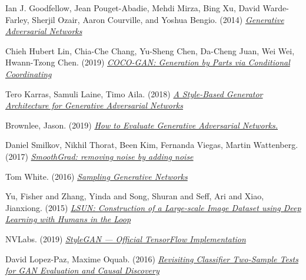 \documentclass[12pt]{article}
\begin{document}
    \begin{thebibliography}{9}
        Ian J. Goodfellow, Jean Pouget-Abadie, Mehdi Mirza, Bing Xu, David Warde-Farley, Sherjil Ozair, Aaron Courville, and Yoshua Bengio. (2014)
        \href{https://papers.nips.cc/paper/2014/file/5ca3e9b122f61f8f06494c97b1afccf3-Paper.pdf}{\textit{Generative Adversarial Networks} }

        Chieh Hubert Lin, Chia-Che Chang, Yu-Sheng Chen, Da-Cheng Juan, Wei Wei, Hwann-Tzong Chen. (2019)
        \href{https://arxiv.org/pdf/1904.00284.pdf}{\textit{COCO-GAN: Generation by Parts via Conditional Coordinating} }

        Tero Karras, Samuli Laine, Timo Aila. (2018)
        \href{https://arxiv.org/pdf/1812.04948.pdf}{\textit{A Style-Based Generator Architecture for Generative Adversarial Networks} }

        Brownlee, Jason. (2019)
        \href{https://machinelearningmastery.com/how-to-evaluate-generative-adversarial-networks/}{\textit{How to Evaluate Generative Adversarial Networks.} }

        Daniel Smilkov, Nikhil Thorat, Been Kim, Fernanda Viegas, Martin Wattenberg. (2017)
        \href{https://arxiv.org/pdf/1706.03825.pdf}{\textit{SmoothGrad: removing noise by adding noise} }

        Tom White. (2016)
        \href{https://arxiv.org/pdf/1609.04468.pdf}{\textit{Sampling Generative Networks} }

        Yu, Fisher and Zhang, Yinda and Song, Shuran and Seff, Ari and Xiao, Jianxiong. (2015)
        \href{https://arxiv.org/pdf/1506.03365.pdf}{\textit{LSUN: Construction of a Large-scale Image Dataset using Deep Learning with Humans in the Loop}}

        NVLabs. (2019) \href{https://github.com/NVlabs/stylegan}{\textit{StyleGAN — Official TensorFlow Implementation}}

        David Lopez-Paz, Maxime Oquab. (2016)
        \href{https://research.fb.com/wp-content/uploads/2017/04/neural_tests.pdf?}{\textit{Revisiting Classifier Two-Sample Tests for GAN Evaluation and Causal Discovery}}

    \end{thebibliography}
\end{document}

